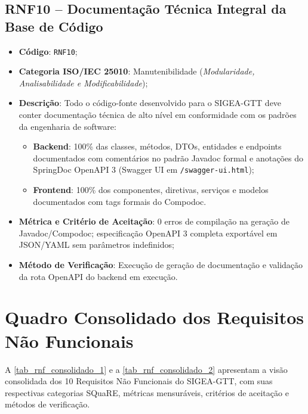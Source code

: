 \subsection{RNF10 -- Documentação Técnica Integral da Base de Código}
\begin{itemize}
    \item \textbf{Código}: \texttt{RNF10};
    \item \textbf{Categoria ISO/IEC 25010}: Manutenibilidade (\textit{Modularidade, Analisabilidade e Modificabilidade});
    \item \textbf{Descrição}: Todo o código-fonte desenvolvido para o SIGEA-GTT deve conter documentação técnica de alto nível em conformidade com os padrões da engenharia de software:
    \begin{itemize}
        \item \textbf{Backend}: 100\% das classes, métodos, DTOs, entidades e endpoints documentados com comentários no padrão Javadoc formal e anotações do SpringDoc OpenAPI 3 (Swagger UI em \texttt{/swagger-ui.html});
        \item \textbf{Frontend}: 100\% dos componentes, diretivas, serviços e modelos documentados com tags formais do Compodoc.
    \end{itemize}
    \item \textbf{Métrica e Critério de Aceitação}: 0 erros de compilação na geração de Javadoc/Compodoc; especificação OpenAPI 3 completa exportável em JSON/YAML sem parâmetros indefinidos;
    \item \textbf{Método de Verificação}: Execução de geração de documentação e validação da rota OpenAPI do backend em execução.
\end{itemize}

\section{Quadro Consolidado dos Requisitos Não Funcionais}
\label{sec_quadro_consolidado_rnf}

A \autoref{tab_rnf_consolidado_1} e a \autoref{tab_rnf_consolidado_2} apresentam a visão consolidada dos 10 Requisitos Não Funcionais do SIGEA-GTT, com suas respectivas categorias SQuaRE, métricas mensuráveis, critérios de aceitação e métodos de verificação.

